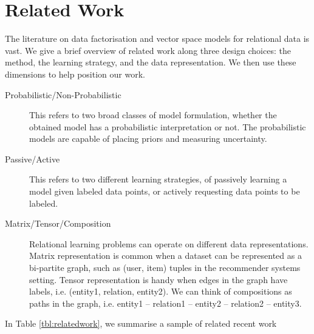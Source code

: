 
\section{Related Work}

The literature on data factorisation and vector space models for 
relational data is vast. 
We give a brief overview of related work along three design choices:
the method, the learning strategy, and the data representation. 
We then use these dimensions to help position our work. 
\begin{description}
\item[Probabilistic/Non-Probabilistic] This refers to two broad classes of model 
formulation, whether the obtained model has a probabilistic interpretation or not. The probabilistic models are capable of placing priors and measuring uncertainty.
\item[Passive/Active] This refers to two different learning strategies, 
of passively learning a model given labeled data points, or actively 
requesting data points to be labeled.
\item[Matrix/Tensor/Composition] Relational learning problems can operate on 
different data representations. Matrix representation is common when a dataset 
can be represented as a bi-partite graph, such as (user, item) tuples in the 
recommender systems setting. Tensor representation is handy when edges in the 
graph have labels, i.e. (entity1, relation, entity2). We can think of 
compositions as paths in the graph, i.e. entity1 -- relation1 -- entity2 -- 
relation2 -- entity3.
\end{description}
In Table \ref{tbl:relatedwork}, we summarise a sample of related recent work 
